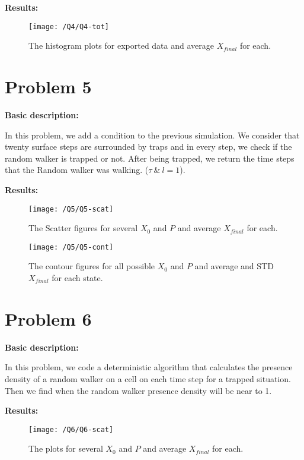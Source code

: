 \documentclass{article}
\begin{document}
    \textbf{Results:}

    \begin{figure}[!htb]
        \centering
        \texttt{[image: /Q4/Q4-tot]}
        \label{fig:4.1}
        \caption{The histogram plots for exported data and average $X_{final}$ for each.}
    \end{figure}

    \pagebreak

    \section*{Problem 5}
    \textbf{Basic description:}

    In this problem, we add a condition to the previous simulation.
    We consider that twenty surface steps are surrounded by traps and in every step,
    we check if the random walker is trapped or not.
    After being trapped, we return the time steps that the Random walker was walking.
    ($\tau\ \& \ l = 1$).

    \textbf{Results:}

    \begin{figure}[!htb]
        \centering
        \texttt{[image: /Q5/Q5-scat]}
        \label{fig:5.1}
        \caption{The Scatter figures for several $X_0$ and $P$ and average $X_{final}$ for each.}
    \end{figure}

    \begin{figure}[!htb]
        \centering
        \texttt{[image: /Q5/Q5-cont]}
        \label{fig:5.2}
        \caption{The contour figures for all possible $X_0$ and $P$ and average and STD $X_{final}$ for each state.}
    \end{figure}

    \section*{Problem 6}
    \textbf{Basic description:}

    In this problem, we code a deterministic algorithm
    that calculates the presence density of a random walker
    on a cell on each time step for a trapped situation.
    Then we find when the random walker presence density will be near to 1.

    \textbf{Results:}

    \begin{figure}[!htb]
        \centering
        \texttt{[image: /Q6/Q6-scat]}
        \label{fig:6.1}
        \caption{The plots for several $X_0$ and $P$ and average $X_{final}$ for each.}
    \end{figure}
\end{document}

